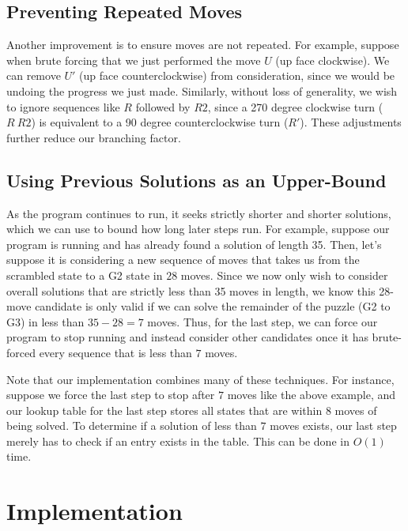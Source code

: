 \documentclass{article}
\begin{document}
\subsection{Preventing Repeated Moves}

Another improvement is to ensure moves are not repeated. For example, suppose when brute forcing that we just performed the move $U$ (up face clockwise). We can remove $U'$ (up face counterclockwise) from consideration, since we would be undoing the progress we just made. Similarly, without loss of generality, we wish to ignore sequences like $R$ followed by $R2$, since a 270 degree clockwise turn ($R\ R2$) is equivalent to a 90 degree counterclockwise turn ($R'$). These adjustments further reduce our branching factor.

\subsection{Using Previous Solutions as an Upper-Bound}

As the program continues to run, it seeks strictly shorter and shorter solutions, which we can use to bound how long later steps run. For example, suppose our program is running and has already found a solution of length 35. Then, let's suppose it is considering a new sequence of moves that takes us from the scrambled state to a G2 state in $28$ moves. Since we now only wish to consider overall solutions that are strictly less than 35 moves in length, we know this 28-move candidate is only valid if we can solve the remainder of the puzzle (G2 to G3) in less than $35-28 = 7$ moves. Thus, for the last step, we can force our program to stop running and instead consider other candidates once it has brute-forced every sequence that is less than $7$ moves.

Note that our implementation combines many of these techniques. For instance, suppose we force the last step to stop after $7$ moves like the above example, and our lookup table for the last step stores all states that are within $8$ moves of being solved. To determine if a solution of less than $7$ moves exists, our last step merely has to check if an entry exists in the table. This can be done in $O(1)$ time.


\section{Implementation}
\end{document}
